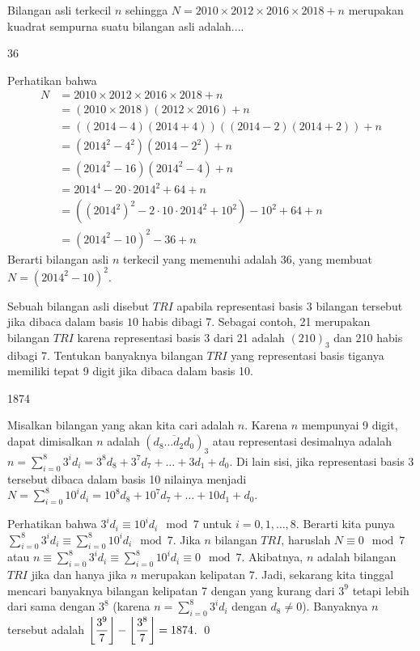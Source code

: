 \documentclass[11pt]{scrartcl}
\begin{document}
	\begin{soalbaru}
		Bilangan asli terkecil $n$ sehingga $N = 2010 \times 2012 \times 2016 \times 2018 + n$ merupakan kuadrat sempurna suatu bilangan asli adalah....
		
		\begin{jawaban}
		36
		\end{jawaban}
		\begin{solusi}
		Perhatikan bahwa \begin{align*}
		N &= 2010 \times 2012 \times 2016 \times 2018 + n\\
		  &= (2010 \times 2018)(2012 \times 2016) + n\\
		  &= ((2014-4)(2014+4))((2014-2)(2014+2))+n\\
		  &= (2014^2-4^2)(2014-2^2)+n\\
		  &= (2014^2-16)(2014^2-4)+n\\
		  &= 2014^4-20 \cdot 2014^2 + 64+n\\
		  &= ((2014^2)^2-2\cdot 10 \cdot 2014^2 + 10^2) -10^2+64+n\\
		  &= (2014^2-10)^2-36+n	  
		\end{align*}Berarti bilangan asli $n$ terkecil yang memenuhi adalah 36, yang membuat $N = (2014^2-10)^2$.
		\end{solusi}
	\end{soalbaru}
	
	\begin{soalbaru}
		Sebuah bilangan asli disebut $TRI$ apabila representasi basis $3$ bilangan tersebut jika dibaca dalam basis $10$ habis dibagi 7. Sebagai contoh, 21 merupakan bilangan $TRI$ karena representasi basis 3 dari 21 adalah $(210)_3$ dan 210 habis dibagi 7. Tentukan banyaknya bilangan $TRI$ yang representasi basis tiganya memiliki tepat 9 digit jika dibaca dalam basis 10.
		
		\begin{jawaban}
		1874
		\end{jawaban}
		\begin{solusi}
		Misalkan bilangan yang akan kita cari adalah $n$. Karena $n$ mempunyai 9 digit, dapat dimisalkan $n$ adalah $(\overline{d_{8}\dots d_2 d_0})_3$ atau representasi desimalnya adalah $n = \sum_{i=0}^{8} 3^id_i = 3^8d_8+3^{7}d_{7}+\dots+3d_1+d_0$. Di lain sisi, jika representasi basis 3 tersebut dibaca dalam basis 10 nilainya menjadi $N = \sum_{i=0}^{8} 10^id_i = 10^8d_8+10^{7}d_{7}+\dots+10d_1+d_0$.
		
		Perhatikan bahwa $3^id_i \equiv 10^id_i \mod 7$ untuk $i=0,1,\dots,8$. Berarti kita punya $\sum_{i=0}^{8} 3^id_i \equiv \sum_{i=0}^{8} 10^id_i \mod 7$. Jika $n$ bilangan $TRI$, haruslah $N \equiv 0 \mod 7$ atau $n\equiv\sum_{i=0}^{8} 3^id_i \equiv \sum_{i=0}^{8} 10^id_i \equiv 0 \mod 7$. Akibatnya, $n$ adalah bilangan $TRI$ jika dan hanya jika $n$ merupakan kelipatan $7$. Jadi, sekarang kita tinggal mencari banyaknya bilangan kelipatan 7 dengan yang kurang dari $3^9$ tetapi lebih dari sama dengan $3^8$ (karena $n = \sum_{i=0}^{8} 3^id_i$ dengan $d_8 \neq 0$). Banyaknya $n$ tersebut adalah $\left\lfloor \dfrac{3^9}{7} \right\rfloor-\left\lfloor \dfrac{3^8}{7} \right\rfloor=1874$. \qed
		\end{solusi}
	\end{soalbaru}
	
\end{document}
